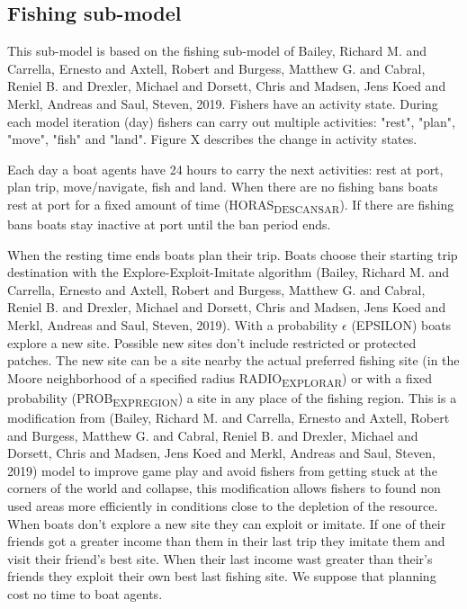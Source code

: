 \documentclass[11pt]{article}
\begin{document}
\subsection{Fishing sub-model}
\label{sec:org9393baf}

This sub-model is based on the fishing sub-model of Bailey, Richard M. and Carrella, Ernesto and Axtell, Robert and Burgess, Matthew G. and Cabral, Reniel B. and Drexler, Michael and Dorsett, Chris and Madsen, Jens Koed and Merkl, Andreas and Saul, Steven, 2019. Fishers have an activity state. During each model iteration (day) fishers can carry out multiple activities: "rest", "plan", "move", "fish" and "land". Figure X describes the change in activity states.

Each day a boat agents have 24 hours to carry the next activities: rest at port, plan trip, move/navigate, fish and land. When there are no fishing bans boats rest at port for a fixed amount of time (HORAS\textsubscript{DESCANSAR}). If there are fishing bans boats stay inactive at port until the ban period ends.

When the resting time ends boats plan their trip. Boats choose their starting trip destination with the Explore-Exploit-Imitate algorithm (Bailey, Richard M. and Carrella, Ernesto and Axtell, Robert and Burgess, Matthew G. and Cabral, Reniel B. and Drexler, Michael and Dorsett, Chris and Madsen, Jens Koed and Merkl, Andreas and Saul, Steven, 2019). With a probability \(\epsilon\) (EPSILON) boats explore a new site. Possible new sites don't include restricted or protected patches. The new site can be a site nearby the actual preferred fishing site (in the Moore neighborhood of a specified radius RADIO\textsubscript{EXPLORAR}) or with a fixed probability (PROB\textsubscript{EXP}\textsubscript{REGION}) a site in any place of the fishing region. This is a modification from (Bailey, Richard M. and Carrella, Ernesto and Axtell, Robert and Burgess, Matthew G. and Cabral, Reniel B. and Drexler, Michael and Dorsett, Chris and Madsen, Jens Koed and Merkl, Andreas and Saul, Steven, 2019) model to improve game play and avoid fishers from getting stuck at the corners of the world and collapse, this modification allows fishers to found non used areas more efficiently in conditions close to the depletion of the resource. When boats don't explore a new site they can exploit or imitate. If one of their friends got a greater income than them in their last trip they imitate them and visit their friend's best site. When their last income wast greater than their's friends they exploit their own best last fishing site. We suppose that planning cost no time to boat agents.
\end{document}
